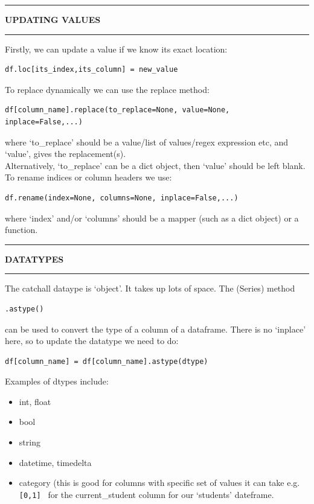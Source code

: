 \documentclass[8pt]{extarticle}
\newcommand{\heading}[1]{%
    \noindent
    \rule{\linewidth}{0.4pt}
    \begin{center}
        \vspace{-1ex}
        \textbf{#1}        
        \vspace{-2.5ex}
    \end{center}
    \rule{\linewidth}{0.4pt}
}
\begin{document}
\begin{multicols}{4}
\setlength{\columnseprule}{1pt} %

\heading{UPDATING VALUES}

Firstly, we can update a value if we know its exact location:
\begin{lstlisting}[style=Python]
df.loc[its_index,its_column] = new_value
\end{lstlisting}
To replace dynamically we can use the replace method:
\begin{lstlisting}[style=Python]
df[column_name].replace(to_replace=None, value=None, inplace=False,...)
\end{lstlisting}
where `to\_replace' should be a value/list of values/regex expression etc, and `value', gives the replacement(s). \\
Alternatively, `to\_replace' can be a dict object, then `value' should be left blank.\\

To rename indices or column headers we use:
\begin{lstlisting}[style=Python]
df.rename(index=None, columns=None, inplace=False,...)
\end{lstlisting}
where `index' and/or `columns' should be a mapper (such as a dict object) or a function.

\heading{DATATYPES}

The catchall dataype is `object'. It takes up lots of space. The (Series) method 
\begin{lstlisting}[style=Python]
.astype() 
\end{lstlisting}
can be used to convert the type of a column of a dataframe.
There is no `inplace' here, so to update the datatype we need to do:
\begin{lstlisting}[style=Python]
df[column_name] = df[column_name].astype(dtype)
\end{lstlisting}
Examples of dtypes include:
\begin{itemize}
    \item int, float
    \item bool
    \item string
    \item datetime, timedelta
    \item category (this is good for columns with specific set of values it can take e.g. \lstinline[style=Python]![0,1] ! for the current\_student column for our `students' dateframe.
\end{itemize}


\end{multicols}
\end{document}

